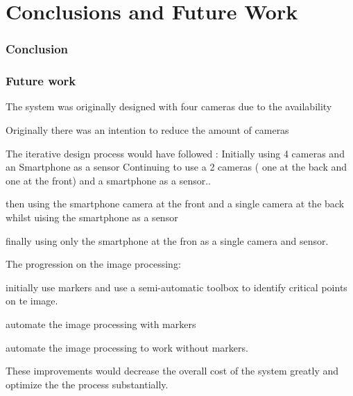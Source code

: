 \chapter{Conclusions and Future Work}

\subsection{Conclusion}

\subsection{Future work}
The system was originally designed with four cameras due to the availability

Originally there was an intention to reduce the amount of cameras

The iterative design process would have followed :
Initially using 4 cameras and an Smartphone as a sensor
Continuing to use a 2 cameras ( one at the back and one at the front)  and a smartphone as a sensor..

then using the smartphone camera at the front and a single camera at the back whilst uising the smartphone as a sensor

finally using only the smartphone at the fron as a single camera and sensor.


The progression on the image processing:

initially use markers and use a semi-automatic toolbox to identify critical points on te image.

automate the image processing with markers

automate the image processing to work without markers.


These improvements would decrease the overall cost of the system greatly and optimize the the process substantially. 










